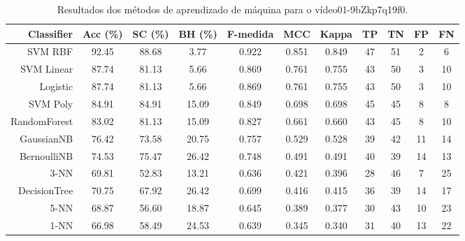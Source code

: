 \begin{table}[!htb]
\centering
\caption{Resultados dos métodos de aprendizado de máquina para o vídeo01-9bZkp7q19f0.}
\label{tab:01-9bZkp7q19f0}
\begin{tabular}{r|c|c|c|c|c|c|c|c|c|c}
\hline\hline
Classifier & Acc (\%) & SC (\%) & BH (\%) & F-medida & MCC & Kappa & TP & TN & FP & FN \\ \hline
SVM RBF & 92.45 & 88.68 & 3.77 & 0.922 & 0.851 & 0.849 & 47 & 51 & 2 & 6 \\ 
SVM Linear & 87.74 & 81.13 & 5.66 & 0.869 & 0.761 & 0.755 & 43 & 50 & 3 & 10 \\ 
Logistic & 87.74 & 81.13 & 5.66 & 0.869 & 0.761 & 0.755 & 43 & 50 & 3 & 10 \\ 
SVM Poly & 84.91 & 84.91 & 15.09 & 0.849 & 0.698 & 0.698 & 45 & 45 & 8 & 8 \\ 
RandomForest & 83.02 & 81.13 & 15.09 & 0.827 & 0.661 & 0.660 & 43 & 45 & 8 & 10 \\ 
GaussianNB & 76.42 & 73.58 & 20.75 & 0.757 & 0.529 & 0.528 & 39 & 42 & 11 & 14 \\ 
BernoulliNB & 74.53 & 75.47 & 26.42 & 0.748 & 0.491 & 0.491 & 40 & 39 & 14 & 13 \\ 
3-NN & 69.81 & 52.83 & 13.21 & 0.636 & 0.421 & 0.396 & 28 & 46 & 7 & 25 \\ 
DecisionTree & 70.75 & 67.92 & 26.42 & 0.699 & 0.416 & 0.415 & 36 & 39 & 14 & 17 \\ 
5-NN & 68.87 & 56.60 & 18.87 & 0.645 & 0.389 & 0.377 & 30 & 43 & 10 & 23 \\ 
1-NN & 66.98 & 58.49 & 24.53 & 0.639 & 0.345 & 0.340 & 31 & 40 & 13 & 22 \\ 
\hline\hline
\end{tabular}
\end{table}
